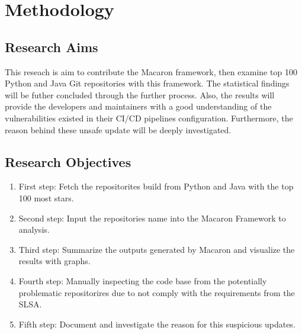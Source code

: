 \section{Methodology}


\subsection{Research Aims}
This reseach is aim to contribute the Macaron framework, then examine top 100 Python and Java Git 
repositories with this framework. The statistical findings will be futher concluded through the further process.
Also, the results will provide the developers and maintainers with a good understanding 
of the vulnerabilities existed in their CI/CD pipelines configuration. Furthermore, the reason behind
these unsafe update will be deeply investigated.

\subsection{Research Objectives}
\begin{enumerate}
    \item First step: Fetch the repositorites build from Python and Java with the top 100 most stars.
    \item Second step: Input the repositories name into the Macaron Framework to analysis. 
    \item Third step: Summarize the outputs generated by Macaron and visualize the results with graphs.
    \item Fourth step: Manually inspecting the code base from the potentially problematic repositorires 
    due to not comply with the requirements from the SLSA.
    \item Fifth step: Document and investigate the reason for this suspicious updates.  
\end{enumerate}
